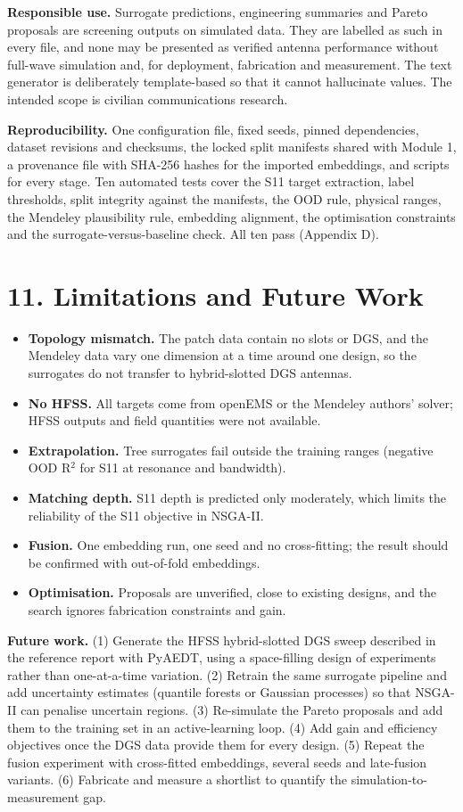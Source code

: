 \documentclass[11pt,a4paper]{article}
\begin{document}
\textbf{Responsible use.} Surrogate predictions, engineering summaries and Pareto proposals are screening outputs on simulated data. They are labelled as such in every file, and none may be presented as verified antenna performance without full-wave simulation and, for deployment, fabrication and measurement. The text generator is deliberately template-based so that it cannot hallucinate values. The intended scope is civilian communications research.

\textbf{Reproducibility.} One configuration file, fixed seeds, pinned dependencies, dataset revisions and checksums, the locked split manifests shared with Module 1, a provenance file with SHA-256 hashes for the imported embeddings, and scripts for every stage. Ten automated tests cover the S11 target extraction, label thresholds, split integrity against the manifests, the OOD rule, physical ranges, the Mendeley plausibility rule, embedding alignment, the optimisation constraints and the surrogate-versus-baseline check. All ten pass (Appendix D).

\section*{11. Limitations and Future Work}
\begin{itemize}[leftmargin=*,itemsep=1pt]
\item \textbf{Topology mismatch.} The patch data contain no slots or DGS, and the Mendeley data vary one dimension at a time around one design, so the surrogates do not transfer to hybrid-slotted DGS antennas.
\item \textbf{No HFSS.} All targets come from openEMS or the Mendeley authors' solver; HFSS outputs and field quantities were not available.
\item \textbf{Extrapolation.} Tree surrogates fail outside the training ranges (negative OOD R$^2$ for S11 at resonance and bandwidth).
\item \textbf{Matching depth.} S11 depth is predicted only moderately, which limits the reliability of the S11 objective in NSGA-II.
\item \textbf{Fusion.} One embedding run, one seed and no cross-fitting; the result should be confirmed with out-of-fold embeddings.
\item \textbf{Optimisation.} Proposals are unverified, close to existing designs, and the search ignores fabrication constraints and gain.
\end{itemize}
\textbf{Future work.} (1) Generate the HFSS hybrid-slotted DGS sweep described in the reference report with PyAEDT, using a space-filling design of experiments rather than one-at-a-time variation. (2) Retrain the same surrogate pipeline and add uncertainty estimates (quantile forests or Gaussian processes) so that NSGA-II can penalise uncertain regions. (3) Re-simulate the Pareto proposals and add them to the training set in an active-learning loop. (4) Add gain and efficiency objectives once the DGS data provide them for every design. (5) Repeat the fusion experiment with cross-fitted embeddings, several seeds and late-fusion variants. (6) Fabricate and measure a shortlist to quantify the simulation-to-measurement gap.
\end{document}
